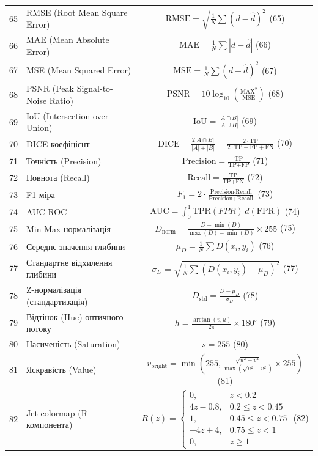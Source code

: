 \documentclass[14pt, a4paper]{extarticle}
\numberwithin{equation}{section}
\begin{document}
\begin{longtable}{|c|p{10cm}|c|}
65 & RMSE (Root Mean Square Error) & $\text{RMSE} = \sqrt{\frac{1}{N} \sum (d-\hat{d})^2}$ \hfill (65) \\
66 & MAE (Mean Absolute Error) & $\text{MAE} = \frac{1}{N} \sum |d-\hat{d}|$ \hfill (66) \\
67 & MSE (Mean Squared Error) & $\text{MSE} = \frac{1}{N} \sum (d-\hat{d})^2$ \hfill (67) \\
68 & PSNR (Peak Signal-to-Noise Ratio) & $\text{PSNR} = 10 \log_{10}\left(\frac{\text{MAX}^2}{\text{MSE}}\right)$ \hfill (68) \\
69 & IoU (Intersection over Union) & $\text{IoU} = \frac{|A \cap B|}{|A \cup B|}$ \hfill (69) \\
70 & DICE коефіцієнт & $\text{DICE} = \frac{2|A \cap B|}{|A|+|B|} = \frac{2 \cdot \text{TP}}{2 \cdot \text{TP} + \text{FP} + \text{FN}}$ \hfill (70) \\
71 & Точність (Precision) & $\text{Precision} = \frac{\text{TP}}{\text{TP} + \text{FP}}$ \hfill (71) \\
72 & Повнота (Recall) & $\text{Recall} = \frac{\text{TP}}{\text{TP} + \text{FN}}$ \hfill (72) \\
73 & F1-міра & $F_1 = 2 \cdot \frac{\text{Precision} \cdot \text{Recall}}{\text{Precision} + \text{Recall}}$ \hfill (73) \\
74 & AUC-ROC & $\text{AUC} = \int_0^1 \text{TPR}(FPR) \, d(\text{FPR})$ \hfill (74) \\
75 & Min-Max нормалізація & $D_{\text{norm}} = \frac{D - \min(D)}{\max(D) - \min(D)} \times 255$ \hfill (75) \\
76 & Середнє значення глибини & $\mu_D = \frac{1}{N} \sum D(x_i,y_i)$ \hfill (76) \\
77 & Стандартне відхилення глибини & $\sigma_D = \sqrt{\frac{1}{N} \sum (D(x_i,y_i) - \mu_D)^2}$ \hfill (77) \\
78 & Z-нормалізація (стандартизація) & $D_{\text{std}} = \frac{D - \mu_D}{\sigma_D}$ \hfill (78) \\
79 & Відтінок (Hue) оптичного потоку & $h = \frac{\arctan(v,u)}{2\pi} \times 180^\circ$ \hfill (79) \\
80 & Насиченість (Saturation) & $s = 255$ \hfill (80) \\
81 & Яскравість (Value) & $v_{\text{bright}} = \min\left(255, \frac{\sqrt{u^2+v^2}}{\max(\sqrt{u^2+v^2})} \times 255\right)$ \hfill (81) \\
82 & Jet colormap (R-компонента) & $R(z) = \begin{cases} 0, & z<0.2 \\ 4z-0.8, & 0.2\leq z<0.45 \\ 1, & 0.45\leq z<0.75 \\ -4z+4, & 0.75\leq z<1 \\ 0, & z\geq1 \end{cases}$ \hfill (82) \\

\end{longtable}
\end{document}
